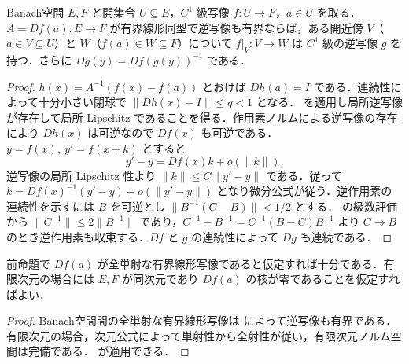\begin{prop}[Banach空間の逆写像定理]
Banach空間 $E,F$ と開集合 $U\subseteq E$，$C^1$ 級写像 $f:U\to F$，$a\in U$ を取る．$A=Df(a):E\to F$ が有界線形同型で逆写像も有界ならば，ある開近傍 $V$（$a\in V\subseteq U$）と $W$（$f(a)\in W\subseteq F$）について $f|_V:V\to W$ は $C^1$ 級の逆写像 $g$ を持つ．さらに $Dg(y)=Df(g(y))^{-1}$ である．
\end{prop}
\begin{proof}
$h(x)=A^{-1}(f(x)-f(a))$ とおけば $Dh(a)=I$ である．連続性によって十分小さい閉球で $\|Dh(x)-I\|\leq q<1$ となる． を適用し局所逆写像が存在して局所 Lipschitz であることを得る．作用素ノルムによる逆写像の存在により $Dh(x)$ は可逆なので $Df(x)$ も可逆である．$y=f(x),\ y'=f(x+k)$ とすると
\[
y'-y=Df(x)k+o(\|k\|).
\]
逆写像の局所 Lipschitz 性より $\|k\|\leq C\|y'-y\|$ である．従って $k=Df(x)^{-1}(y'-y)+o(\|y'-y\|)$ となり微分公式が従う．逆作用素の連続性を示すには $B$ を可逆とし $\|B^{-1}(C-B)\|<1/2$ とする． の級数評価から $\|C^{-1}\|\leq2\|B^{-1}\|$ であり，$C^{-1}-B^{-1}=C^{-1}(B-C)B^{-1}$ より $C\to B$ のとき逆作用素も収束する．$Df$ と $g$ の連続性によって $Dg$ も連続である．
\end{proof}
\begin{prop}[一点での全単射性による判定]
前命題で $Df(a)$ が全単射な有界線形写像であると仮定すれば十分である．有限次元の場合には $E,F$ が同次元であり $Df(a)$ の核が零であることを仮定すればよい．
\end{prop}
\begin{proof}
Banach空間間の全単射な有界線形写像は  によって逆写像も有界である．有限次元の場合，次元公式によって単射性から全射性が従い，有限次元ノルム空間は完備である． が適用できる．
\end{proof}
